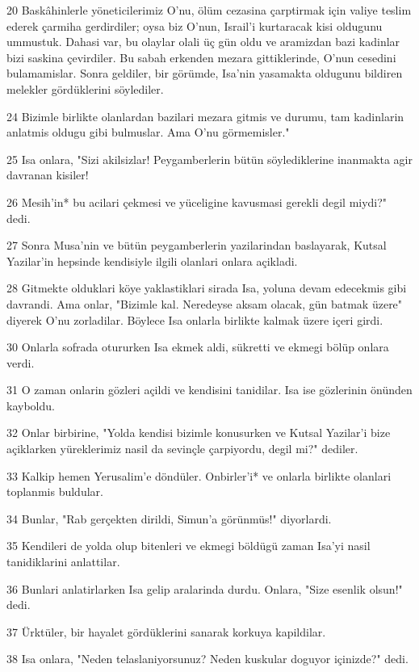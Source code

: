 \par 20 Baskâhinlerle yöneticilerimiz O'nu, ölüm cezasina çarptirmak için valiye teslim ederek çarmiha gerdirdiler; oysa biz O'nun, Israil'i kurtaracak kisi oldugunu ummustuk. Dahasi var, bu olaylar olali üç gün oldu ve aramizdan bazi kadinlar bizi saskina çevirdiler. Bu sabah erkenden mezara gittiklerinde, O'nun cesedini bulamamislar. Sonra geldiler, bir görümde, Isa'nin yasamakta oldugunu bildiren melekler gördüklerini söylediler.
\par 24 Bizimle birlikte olanlardan bazilari mezara gitmis ve durumu, tam kadinlarin anlatmis oldugu gibi bulmuslar. Ama O'nu görmemisler."
\par 25 Isa onlara, "Sizi akilsizlar! Peygamberlerin bütün söylediklerine inanmakta agir davranan kisiler!
\par 26 Mesih'in* bu acilari çekmesi ve yüceligine kavusmasi gerekli degil miydi?" dedi.
\par 27 Sonra Musa'nin ve bütün peygamberlerin yazilarindan baslayarak, Kutsal Yazilar'in hepsinde kendisiyle ilgili olanlari onlara açikladi.
\par 28 Gitmekte olduklari köye yaklastiklari sirada Isa, yoluna devam edecekmis gibi davrandi. Ama onlar, "Bizimle kal. Neredeyse aksam olacak, gün batmak üzere" diyerek O'nu zorladilar. Böylece Isa onlarla birlikte kalmak üzere içeri girdi.
\par 30 Onlarla sofrada otururken Isa ekmek aldi, sükretti ve ekmegi bölüp onlara verdi.
\par 31 O zaman onlarin gözleri açildi ve kendisini tanidilar. Isa ise gözlerinin önünden kayboldu.
\par 32 Onlar birbirine, "Yolda kendisi bizimle konusurken ve Kutsal Yazilar'i bize açiklarken yüreklerimiz nasil da sevinçle çarpiyordu, degil mi?" dediler.
\par 33 Kalkip hemen Yerusalim'e döndüler. Onbirler'i* ve onlarla birlikte olanlari toplanmis buldular.
\par 34 Bunlar, "Rab gerçekten dirildi, Simun'a görünmüs!" diyorlardi.
\par 35 Kendileri de yolda olup bitenleri ve ekmegi böldügü zaman Isa'yi nasil tanidiklarini anlattilar.
\par 36 Bunlari anlatirlarken Isa gelip aralarinda durdu. Onlara, "Size esenlik olsun!" dedi.
\par 37 Ürktüler, bir hayalet gördüklerini sanarak korkuya kapildilar.
\par 38 Isa onlara, "Neden telaslaniyorsunuz? Neden kuskular doguyor içinizde?" dedi.
